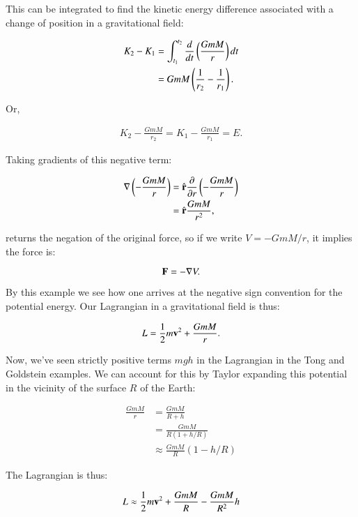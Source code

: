 \documentclass{article}      %
\newcommand{\grad}[0]{\nabla}
\begin{document}
This can be integrated to find the kinetic energy difference associated with a change of position in a gravitational field:

\begin{align*}
K_2 - K_1 
&= \int_{t_1}^{t_2} \frac{d}{dt} \left( \frac{GmM }{r} \right) dt \\
&= GmM \left( \frac{1}{r_2} - \frac{1}{r_1} \right).
\end{align*}

Or, 

\begin{align*}
K_2 - \frac{GmM}{r_2} = K_1 - \frac{GmM}{r_1} = E.
\end{align*}

Taking gradients of this negative term:

\begin{align*}
\grad \left( - \frac{GmM}{r} \right)
&= \rcap \frac{\partial}{\partial r} \left( - \frac{GmM}{r} \right) \\
&= \rcap \frac{GmM}{r^2},
\end{align*}

returns the negation of the original force, so if we write $V = -GmM/r$, it implies the force is:

\begin{equation}
\BF = -\grad V.
\end{equation}

By this example we see how one arrives at the negative sign convention for the potential energy.  Our 
Lagrangian in a gravitational field is thus:

\begin{equation}
L = \frac{1}{2} m \mathbf{v}^2 + \frac{GmM}{r}.
\end{equation}

Now, we've seen strictly positive terms $mgh$ in the Lagrangian in the Tong and Goldstein examples.  We can account for this by
Taylor expanding this potential in the vicinity of the surface $R$ of the Earth:

\begin{align*}
\frac{GmM}{r} 
&= \frac{GmM}{R + h} \\
&= \frac{GmM}{R(1 + h/R)} \\
&\approx \frac{GmM}{R} (1 - h/R)
\end{align*}

The Lagrangian is thus:

\begin{equation*}
L \approx \frac{1}{2} m \mathbf{v}^2 + \frac{GmM}{R} -\frac{GmM}{R^2} h
\end{equation*}
\end{document}
